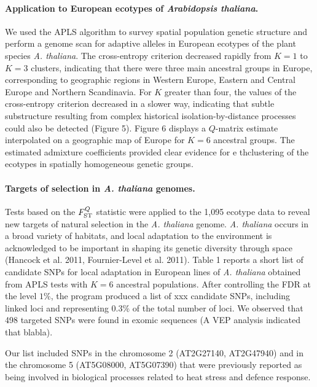  
\paragraph{Application to European ecotypes of {\it Arabidopsis  thaliana}.} We used  the APLS algorithm to survey spatial population genetic structure and perform a genome scan for adaptive alleles in European ecotypes of the plant species {\it A.  thaliana}. The cross-entropy criterion decreased rapidly from $K=1$ to $K=3$ clusters,  indicating  that  there were three 
main ancestral groups in Europe, corresponding to geographic regions in Western Europe, Eastern and Central Europe and Northern Scandinavia. For $K$ greater than four, the values of the cross-entropy criterion decreased in a slower way, indicating that subtle substructure resulting from complex historical isolation-by-distance  processes could also be detected (Figure 5). 
Figure 6 displays a $Q$-matrix estimate  interpolated on a geographic map of Europe for $K = 6$ ancestral groups. The estimated admixture coefficients provided clear evidence for e thclustering of the ecotypes in spatially homogeneous genetic groups. 

\paragraph{Targets of selection in {\it A.  thaliana} genomes.}  Tests based on the $F^Q_{\rm ST}$  statistic were applied to the 1,095 ecotype data to reveal new targets of natural selection in the {\it A. thaliana} genome. {\it A. thaliana} occurs in a broad variety of habitats, and local adaptation to the environment is acknowledged to be important in shaping its genetic diversity through space (Hancock et al. 2011, Fournier-Level et al. 2011). Table 1 reports a short list of candidate SNPs for local adaptation in European lines of {\it A. thaliana} obtained from APLS tests with $K=6$ ancestral populations.  After controlling the FDR at the level $1\%$, the program produced a list of xxx candidate SNPs, including linked loci and representing 0.3\% of the total number of loci. We observed that 498 targeted SNPs were found in exomic sequences (A VEP analysis indicated  that blabla). 
 
 Our list included SNPs in the chromosome 2 (AT2G27140, AT2G47940) and in the chromosome 5 (AT5G08000, AT5G07390) that were previously reported as being involved in biological processes related to heat stress and defence response. 
 
